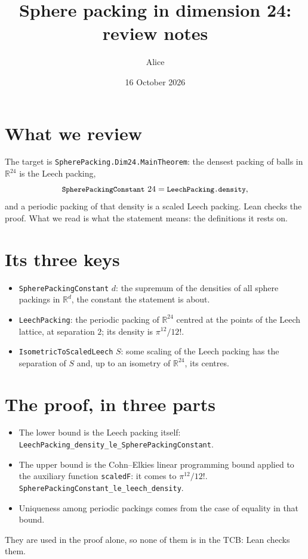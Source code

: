\documentclass[11pt]{article}
\title{Sphere packing in dimension 24:\\ review notes}
\author{Alice}
\date{16 October 2026}
\newcommand{\lean}[1]{{\small\texttt{#1}}}
\begin{document}
\maketitle

\section*{What we review}

The target is \lean{SpherePacking.Dim24.MainTheorem}: the densest packing of balls in
$\mathbb{R}^{24}$ is the Leech packing,
\[
  \lean{SpherePackingConstant}\ 24 = \lean{LeechPacking.density},
\]
and a periodic packing of that density is a scaled Leech packing. Lean checks the proof. What we
read is what the statement means: the definitions it rests on.

\section*{Its three keys}

\begin{itemize}
  \item \lean{SpherePackingConstant} $d$: the supremum of the densities of all sphere packings in
        $\mathbb{R}^d$, the constant the statement is about.
  \item \lean{LeechPacking}: the periodic packing of $\mathbb{R}^{24}$ centred at the points of the
        Leech lattice, at separation $2$; its density is $\pi^{12}/12!$.
  \item \lean{IsometricToScaledLeech} $S$: some scaling of the Leech packing has the separation of
        $S$ and, up to an isometry of $\mathbb{R}^{24}$, its centres.
\end{itemize}

\section*{The proof, in three parts}

\begin{itemize}
  \item The lower bound is the Leech packing itself:\\
        \lean{LeechPacking\_density\_le\_SpherePackingConstant}.
  \item The upper bound is the Cohn--Elkies linear programming bound applied to the auxiliary
        function \lean{scaledF}: it comes to $\pi^{12}/12!$.\\
        \lean{SpherePackingConstant\_le\_leech\_density}.
  \item Uniqueness among periodic packings comes from the case of equality in that bound.
\end{itemize}

They are used in the proof alone, so none of them is in the TCB: Lean checks them.
\end{document}
